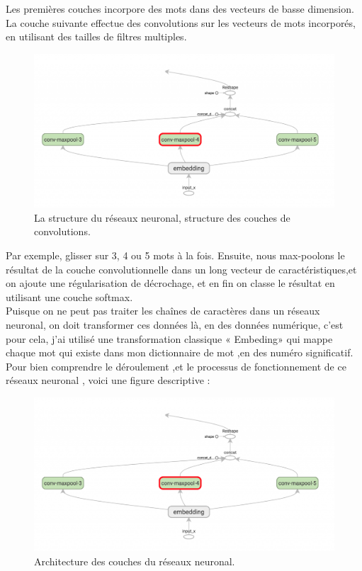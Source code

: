 Les premières couches incorpore des mots dans des vecteurs de basse dimension. La couche suivante effectue des convolutions sur les vecteurs de mots incorporés, en utilisant des tailles de filtres multiples.\\[0.2cm]

\begin{figure}[H]
	\begin{center}
	\includegraphics[width=\linewidth]{Images/cnn1.png}
	\end{center}
	\caption{La structure du réseaux neuronal, structure des couches de convolutions.}
	\label{fig:cnn1}
\end{figure}
 Par exemple, glisser sur 3, 4 ou 5 mots à la fois. Ensuite, nous max-poolons le résultat de la couche convolutionnelle dans un long vecteur de caractéristiques,et on ajoute une régularisation de décrochage, et en fin on  classe le résultat en utilisant une couche softmax.\\[0.5cm]
 
Puisque on ne peut pas traiter les chaînes de caractères dans un réseaux neuronal, on doit transformer ces données là, en des données numérique, c’est pour cela, j’ai utilisé une transformation classique « Embeding» qui mappe chaque mot qui existe dans mon dictionnaire de mot ,en des numéro significatif.\\[0.2cm]
Pour bien comprendre le déroulement ,et le processus de fonctionnement de ce réseaux neuronal , voici une figure descriptive :

\begin{figure}[H]
	\begin{center}
	\includegraphics[width=\linewidth]{Images/cnn1.png}
	\end{center}
	\caption{Architecture des couches du réseaux neuronal.}
	\label{fig:cnn2}
\end{figure}

